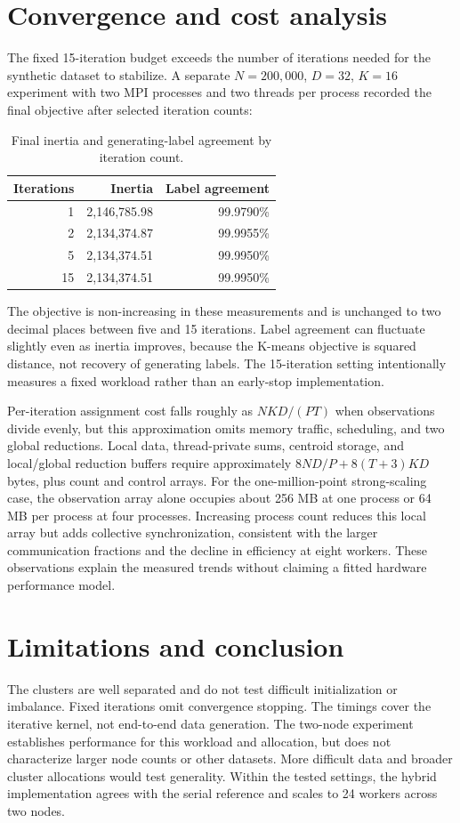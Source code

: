 \documentclass[9pt,a4paper]{extarticle}
\begin{document}
\section{Convergence and cost analysis}
The fixed 15-iteration budget exceeds the number of iterations needed for the synthetic dataset to stabilize. A separate $N=200{,}000$, $D=32$, $K=16$ experiment with two MPI processes and two threads per process recorded the final objective after selected iteration counts:
\begin{table}[H]\centering\small
\caption{Final inertia and generating-label agreement by iteration count.}
\begin{tabular}{rrr}\toprule
Iterations & Inertia & Label agreement \\
\midrule
1 & 2,146,785.98 & 99.9790\% \\
2 & 2,134,374.87 & 99.9955\% \\
5 & 2,134,374.51 & 99.9950\% \\
15 & 2,134,374.51 & 99.9950\% \\
\bottomrule\end{tabular}\end{table}
The objective is non-increasing in these measurements and is unchanged to two decimal places between five and 15 iterations. Label agreement can fluctuate slightly even as inertia improves, because the K-means objective is squared distance, not recovery of generating labels. The 15-iteration setting intentionally measures a fixed workload rather than an early-stop implementation.

Per-iteration assignment cost falls roughly as $NKD/(PT)$ when observations divide evenly, but this approximation omits memory traffic, scheduling, and two global reductions. Local data, thread-private sums, centroid storage, and local/global reduction buffers require approximately $8ND/P+8(T+3)KD$ bytes, plus count and control arrays. For the one-million-point strong-scaling case, the observation array alone occupies about 256 MB at one process or 64 MB per process at four processes. Increasing process count reduces this local array but adds collective synchronization, consistent with the larger communication fractions and the decline in efficiency at eight workers. These observations explain the measured trends without claiming a fitted hardware performance model.

\section{Limitations and conclusion}
The clusters are well separated and do not test difficult initialization or imbalance. Fixed iterations omit convergence stopping. The timings cover the iterative kernel, not end-to-end data generation. The two-node experiment establishes performance for this workload and allocation, but does not characterize larger node counts or other datasets. More difficult data and broader cluster allocations would test generality. Within the tested settings, the hybrid implementation agrees with the serial reference and scales to 24 workers across two nodes.
\end{document}
